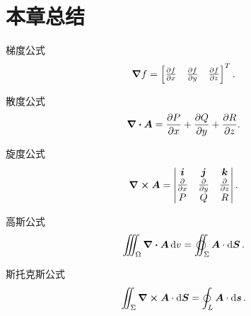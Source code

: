 \section{本章总结}
梯度公式\[
	\grad f
	= \begin{bmatrix}
		\pdv{f}{x} & \pdv{f}{y} & \pdv{f}{z}
	\end{bmatrix}^T.
\]

散度公式\[
	\div{\boldsymbol{A}}
	= \pdv{P}{x}+\pdv{Q}{y}+\pdv{R}{z}.
\]

旋度公式\[
	\curl{\boldsymbol{A}}
	= \begin{vmatrix}
		\boldsymbol{i} & \boldsymbol{j} & \boldsymbol{k} \\
		\pdv{x} & \pdv{y} & \pdv{z} \\
		P & Q & R \\
	\end{vmatrix}.
\]

高斯公式\[
	\iiint_\Omega \div{\vb{A}} \dd{v}
	= \varoiint_\Sigma \vb{A} \cdot \dd{\vb{S}}.
\]

斯托克斯公式\[
	\iint_\Sigma \curl{\boldsymbol{A}} \cdot \dd{\boldsymbol{S}}
	= \oint_L \boldsymbol{A} \cdot \dd{\boldsymbol{s}}.
\]
